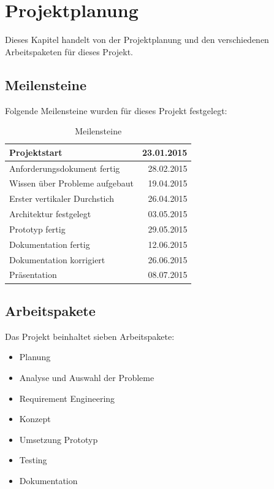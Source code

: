 %
%

\chapter{Projektplanung}\label{chap.projektplanung}
Dieses Kapitel handelt von der Projektplanung und den verschiedenen Arbeitspaketen für dieses Projekt.

\section{Meilensteine}\label{meilensteine}
Folgende Meilensteine wurden für dieses Projekt festgelegt:

\begin{table}[ht]
\centering
  \begin{tabular}{ l | r }
	\hline
	\rowcolor{gray}
	\textbf{Projektstart}			&	\textbf{23.01.2015}\\ \hline
	Anforderungsdokument fertig		&	28.02.2015	\\ \hline
	Wissen über Probleme aufgebaut		&	19.04.2015	\\ \hline
	Erster vertikaler Durchstich		& 	26.04.2015	\\ \hline
	Architektur festgelegt			&	03.05.2015	\\ \hline
	Prototyp fertig				&	29.05.2015	\\ \hline
	Dokumentation fertig			&	12.06.2015	\\ \hline
	Dokumentation korrigiert			&	26.06.2015	\\ \hline
	Präsentation					&	08.07.2015 \\ \hline
  \end{tabular}
   \caption{Meilensteine}\label{table:milestones}
\end{table}

\section{Arbeitspakete}\label{arbeitspakete}
Das Projekt beinhaltet sieben Arbeitspakete:
\begin{itemize}
\item Planung
\item Analyse und Auswahl der Probleme
\item Requirement Engineering
\item Konzept
\item Umsetzung Prototyp
\item Testing
\item Dokumentation
\end{itemize}

